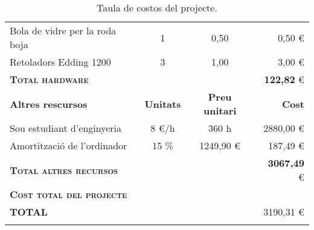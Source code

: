 \begin{longtable}{@{\extracolsep{\fill}} lccr}
	Bola de vidre per la roda boja & 1 & 0,50 & 0,50 \euro \\
	Retoladors Edding 1200 & 3 & 1,00 & 3,00 \euro \\
	\midrule
	\textsc{\textbf{Total hardware}}         && & \textbf{122,82} \euro\\
	\toprule
	\textbf{Altres rescursos} & \textbf{Unitats} & \textbf{Preu unitari} & \textbf{Cost} \\
	\midrule
	Sou estudiant d'enginyeria & 8 \euro/h & 360 h & 2880,00 \euro \\
	Amortització de l'ordinador & 15 \% & 1249,90 \euro & 187,49 \euro \\
	\midrule
	\textsc{\textbf{Total altres recursos}}  & & & \textbf{3067,49} \euro\\
	\toprule
	\toprule
	\textbf{\textsc{Cost total del projecte}} & \\
	\toprule
	\toprule
	\textbf{TOTAL} &&& 3190,31 \euro \\
	\bottomrule    
	\caption{Taula de costos del projecte.}            
\end{longtable}